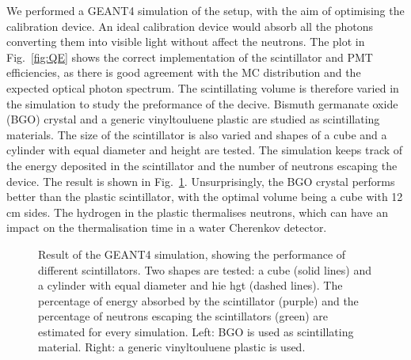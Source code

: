 We performed a GEANT4 simulation of the setup, with the aim of optimising the calibration device.
An ideal calibration device would absorb all the photons converting them into visible light without affect the neutrons.
The plot in Fig.~\ref{fig:QE} shows the correct implementation of the scintillator and PMT efficiencies, %
as there is good agreement with the MC distribution and the expected optical photon spectrum.
The scintillating volume is therefore varied in the simulation to study the preformance of the decive.
Bismuth germanate oxide (BGO) crystal and a generic vinyltouluene plastic are studied as scintillating materials.
The size of the scintillator is also varied and shapes of a cube and a cylinder with equal diameter and height are tested.
The simulation keeps track of the energy deposited in the scintillator and the number of neutrons escaping the device.
The result is shown in Fig.~\ref{fig:geant4}.
Unsurprisingly, the BGO crystal performs better than the plastic scintillator, %
with the optimal volume being a cube with 12\,cm sides.
The hydrogen in the plastic thermalises neutrons, which can have an impact on the thermalisation time %
in a water Cherenkov detector.

\begin{figure}
	\centering
	\resizebox{0.9\textwidth}{!}{}
	\caption{Result of the GEANT4 simulation, showing the performance of different scintillators.
		Two shapes are tested: a cube (solid lines) and a cylinder with equal diameter and hie hgt (dashed lines).
		The percentage of energy absorbed by the scintillator (purple) and the percentage of neutrons escaping the %
		scintillators (green) are estimated for every simulation.
		Left: BGO is used as scintillating material. Right: a generic vinyltouluene plastic is used.}
	\label{fig:geant4}
\end{figure}


